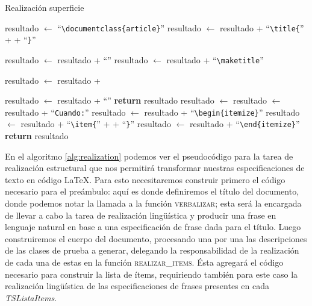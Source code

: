 \begin{algorithm}
  \caption{Realización superficie}\label{alg:realization}
  \begin{algorithmic}[1]
  
  \State resultado $\gets$ ``\verb|\documentclass{article}|''
  \State resultado $\gets$ resultado + ``\verb|\title{|'' +  + ``\verb|}|''
  
  \State resultado $\gets$ resultado + ``\verb||''
  \State resultado $\gets$ resultado + ``\verb|\maketitle|''
  
    \State resultado $\gets$ resultado +   
  \EndFor

  \State resultado $\gets$ resultado + ``\verb||''
  \State \textbf{return} resultado
  \EndFunction
  \Statex
    \State resultado $\gets$  
	\State resultado $\gets$ resultado + ``\verb|Cuando:|''
    \State resultado $\gets$ resultado + ``\verb|\begin{itemize}|''
      \State resultado $\gets$ resultado + ``\verb|\item{|'' +  + ``\verb|}|'' 
    \EndFor  
    \State resultado $\gets$ resultado + ``\verb|\end{itemize}|''
    \State \textbf{return} resultado
  \EndFunction
\end{algorithmic}
\end{algorithm}

En el algoritmo \ref{alg:realization} podemos ver el pseudocódigo para la tarea de realización estructural que nos permitirá transformar nuestras especificaciones de texto en código \LaTeX. Para esto necesitaremos construir primero el código necesario para el preámbulo: aquí es donde definiremos el título del documento, donde podemos notar la llamada a la función \textsc{verbalizar}; esta será la encargada de llevar a cabo la tarea de realización lingüística y producir una frase en lenguaje natural en base a una especificación de frase dada para el título. Luego construiremos el cuerpo del documento, procesando una por una las descripciones de las clases de prueba a generar, delegando la responsabilidad de la realización de cada una de estas en la función \textsc{realizar\_items}. Ésta agregará el código necesario para construir la lista de ítems, requiriendo también para este caso la realización lingüística de las especificaciones de frases presentes en cada \emph{TSListaItems}.

